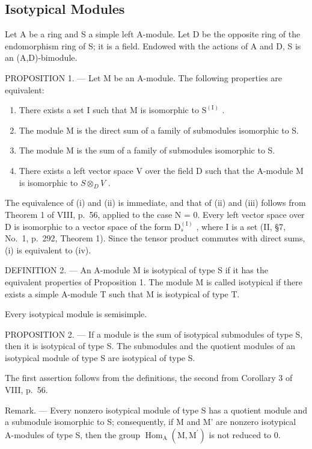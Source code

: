 \subsection{Isotypical Modules}

Let A be a ring and S a simple left A-module. Let D be the opposite ring of the endomorphism ring of S; it is a field. Endowed with the actions of A and D, S is an (A,D)-bimodule.

PROPOSITION 1. --- Let M be an A-module. The following properties are equivalent:

\begin{enumerate}
\def\labelenumi{(\roman{enumi})}
\item
  There exists a set I such that M is isomorphic to \(\mathrm{S}^{(\mathrm{I})}\) .
\item
  The module M is the direct sum of a family of submodules isomorphic to S.
\item
  The module M is the sum of a family of submodules isomorphic to S.
\item
  There exists a left vector space V over the field D such that the A-module M is isomorphic to \(S \otimes_{D} V\) .
\end{enumerate}

The equivalence of (i) and (ii) is immediate, and that of (ii) and (iii) follows from Theorem 1 of VIII, p.~56, applied to the case N = 0. Every left vector space over D is isomorphic to a vector space of the form \(\mathrm{D}_{s}^{(\mathrm{I})}\) , where I is a set (II, §7, No.~1, p.~292, Theorem 1). Since the tensor product commutes with direct sums, (i) is equivalent to (iv).

DEFINITION 2. --- An A-module M is isotypical of type S if it has the equivalent properties of Proposition 1. The module M is called isotypical if there exists a simple A-module T such that M is isotypical of type T.

Every isotypical module is semisimple.

PROPOSITION 2. --- If a module is the sum of isotypical submodules of type S, then it is isotypical of type S. The submodules and the quotient modules of an isotypical module of type S are isotypical of type S.

The first assertion follows from the definitions, the second from Corollary 3 of VIII, p.~56.

Remark. --- Every nonzero isotypical module of type S has a quotient module and a submodule isomorphic to S; consequently, if M and M' are nonzero isotypical A-modules of type S, then the group \(\operatorname{Hom}_{\mathrm{A}}(\mathrm{M},\mathrm{M}^{\prime})\) is not reduced to 0.

